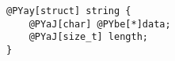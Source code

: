 \begin{Verbatim}[commandchars=@\[\]]
@PYay[struct] string {
    @PYaJ[char] @PYbe[*]data;
    @PYaJ[size_t] length;
}
\end{Verbatim}
